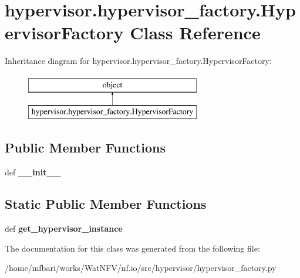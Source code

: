 \hypertarget{classhypervisor_1_1hypervisor__factory_1_1HypervisorFactory}{\section{hypervisor.\-hypervisor\-\_\-factory.\-Hypervisor\-Factory Class Reference}
\label{classhypervisor_1_1hypervisor__factory_1_1HypervisorFactory}
}
Inheritance diagram for hypervisor.\-hypervisor\-\_\-factory.\-Hypervisor\-Factory\-:\begin{figure}[H]
\begin{center}
\leavevmode
\includegraphics[height=2.000000cm]{classhypervisor_1_1hypervisor__factory_1_1HypervisorFactory}
\end{center}
\end{figure}
\subsection*{Public Member Functions}
\begin{DoxyCompactItemize}
\item 
\hypertarget{classhypervisor_1_1hypervisor__factory_1_1HypervisorFactory_ab1691cc3620d76c0a266e0fd469548ad}{def {\bfseries \-\_\-\-\_\-init\-\_\-\-\_\-}}\label{classhypervisor_1_1hypervisor__factory_1_1HypervisorFactory_ab1691cc3620d76c0a266e0fd469548ad}

\end{DoxyCompactItemize}
\subsection*{Static Public Member Functions}
\begin{DoxyCompactItemize}
\item 
\hypertarget{classhypervisor_1_1hypervisor__factory_1_1HypervisorFactory_ade4356e4251e644d580f8c1c53fc704e}{def {\bfseries get\-\_\-hypervisor\-\_\-instance}}\label{classhypervisor_1_1hypervisor__factory_1_1HypervisorFactory_ade4356e4251e644d580f8c1c53fc704e}

\end{DoxyCompactItemize}


The documentation for this class was generated from the following file\-:\begin{DoxyCompactItemize}
\item 
/home/mfbari/works/\-Wat\-N\-F\-V/nf.\-io/src/hypervisor/hypervisor\-\_\-factory.\-py\end{DoxyCompactItemize}
